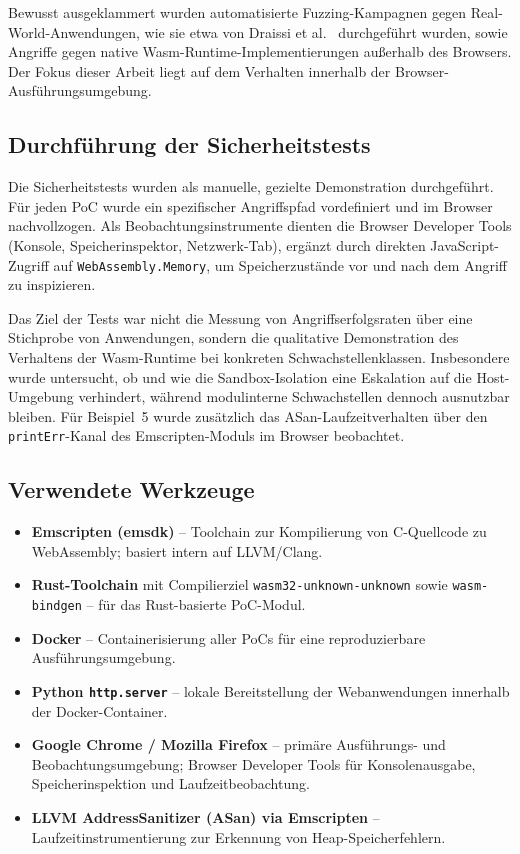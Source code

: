 Bewusst ausgeklammert wurden automatisierte Fuzzing-Kampagnen gegen Real-World-Anwendungen, wie sie etwa von Draissi et al.~\cite{10.1145/3728937} durchgeführt wurden, sowie Angriffe gegen native Wasm-Runtime-Implementierungen außerhalb des Browsers. Der Fokus dieser Arbeit liegt auf dem Verhalten innerhalb der Browser-Ausführungsumgebung.

\subsection{Durchführung der Sicherheitstests}

Die Sicherheitstests wurden als manuelle, gezielte Demonstration durchgeführt. Für jeden PoC wurde ein spezifischer Angriffspfad vordefiniert und im Browser nachvollzogen. Als Beobachtungsinstrumente dienten die Browser Developer Tools (Konsole, Speicherinspektor, Netzwerk-Tab), ergänzt durch direkten JavaScript-Zugriff auf \texttt{WebAssembly.Memory}, um Speicherzustände vor und nach dem Angriff zu inspizieren.

Das Ziel der Tests war nicht die Messung von Angriffserfolgsraten über eine Stichprobe von Anwendungen, sondern die qualitative Demonstration des Verhaltens der Wasm-Runtime bei konkreten Schwachstellenklassen. Insbesondere wurde untersucht, ob und wie die Sandbox-Isolation eine Eskalation auf die Host-Umgebung verhindert, während modulinterne Schwachstellen dennoch ausnutzbar bleiben. Für Beispiel~5 wurde zusätzlich das ASan-Laufzeitverhalten über den \texttt{printErr}-Kanal des Emscripten-Moduls im Browser beobachtet.

\subsection{Verwendete Werkzeuge}

\begin{itemize}
  \item \textbf{Emscripten (emsdk)} -- Toolchain zur Kompilierung von C-Quellcode zu WebAssembly; basiert intern auf LLVM/Clang.
  \item \textbf{Rust-Toolchain} mit Compilierziel \texttt{wasm32-unknown-unknown} sowie \texttt{wasm-bindgen} -- für das Rust-basierte PoC-Modul.
  \item \textbf{Docker} -- Containerisierung aller PoCs für eine reproduzierbare Ausführungsumgebung.
  \item \textbf{Python \texttt{http.server}} -- lokale Bereitstellung der Webanwendungen innerhalb der Docker-Container.
  \item \textbf{Google Chrome / Mozilla Firefox} -- primäre Ausführungs- und Beobachtungsumgebung; Browser Developer Tools für Konsolenausgabe, Speicherinspektion und Laufzeitbeobachtung.
  \item \textbf{LLVM AddressSanitizer (ASan) via Emscripten} -- Laufzeitinstrumentierung zur Erkennung von Heap-Speicherfehlern.
\end{itemize}

